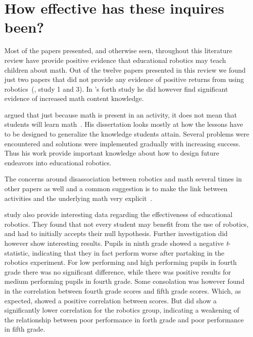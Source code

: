 \section{How effective has these inquires been?}
Most of the papers presented, and otherwise seen, throughout this literature review have provide positive evidence that educational robotics
may teach children about math. 
Out of the twelve papers presented in this review we found just two papers that did not provide any evidence of positive returns from using robotics~(, study 1 and 3). 
In \citeauthor{silk2011resources}'s forth study he did however find significant evidence of increased math content knowledge. 

\bigskip\noindent
\citeauthor{silk2011resources} argued that just because math is present in an activity, it does not mean that students will learn math~\cite{silk2011resources}.
His dissertation looks mostly at how the lessons have to be designed to generalize the knowledge students attain. Several problems were encountered and solutions were implemented gradually with increasing success. 
Thus his work provide important knowledge about how to design future endeavors into educational robotics. 

\bigskip\noindent
The concerns around disassociation between robotics and math several times in other papers as well and a common suggestion is to make the link between activities and the underlying math very explicit~\cite{nugent2008effect}. 

\bigskip\noindent
\citeauthor*{lindh2007does} study also provide interesting data regarding the effectiveness of educational robotics. 
They found that not every student may benefit from the use of robotics, and had to initially accepts their null hypothesis. 
Further investigation did however show interesting results. 
Pupils in ninth grade showed a negative \textit{t}-statistic, indicating that they in fact perform worse after partaking in the robotics experiment. 
For low performing and high performing pupils in fourth grade there was no significant difference, while there was positive results for medium performing pupils in fourth grade. 
Some consolation was however found in the correlation between fourth grade scores and fifth grade scores. 
Which, as expected, showed a positive correlation between scores. 
But did show a significantly lower correlation for the robotics group, indicating a weakening of the relationship between poor performance in forth grade and poor performance in fifth grade. 


